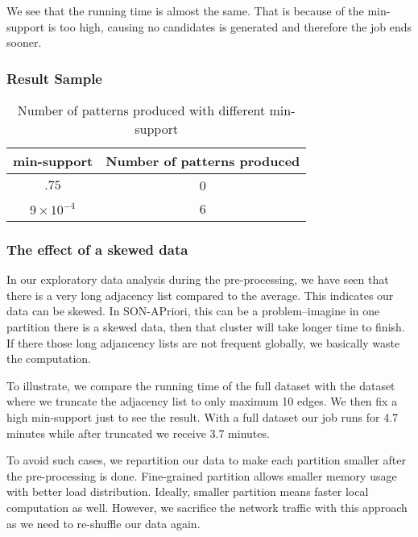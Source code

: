 \documentclass[11pt]{article}
\begin{document}
We see that the running time is almost the same. 
That is because of the min-support is too high, causing no candidates is generated and therefore the job ends sooner.

\subsubsection{Result Sample}

\begin{table}[h!]
    \centering
    \begin{tabular}{||c c||}
        \hline
        min-support & Number of patterns produced \\
        \hline\hline
        $.75$ & 0 \\
        $9 \times 10^{-4}$ & 6 \\
        \hline
    \end{tabular}
    \caption{Number of patterns produced with different min-support}
    \label{table:5}
\end{table}

\subsubsection{The effect of a skewed data}

In our exploratory data analysis during the pre-processing, we have seen that there is a very long adjacency list compared to the average.
This indicates our data can be skewed.
In SON-APriori, this can be a problem--imagine in one partition there is a skewed data, then that cluster will take longer time to finish.
If there those long adjancency lists are not frequent globally, we basically waste the computation.

To illustrate, we compare the running time of the full dataset with the dataset where we truncate the adjacency list to only maximum 10 edges.
We then fix a high min-support just to see the result.
With a full dataset our job runs for 4.7 minutes while after truncated we receive 3.7 minutes. 

To avoid such cases, we repartition our data to make each partition smaller after the pre-processing is done.
Fine-grained partition allows smaller memory usage with better load distribution.
Ideally, smaller partition means faster local computation as well.
However, we sacrifice the network traffic with this approach as we need to re-shuffle our data again.
\end{document}
